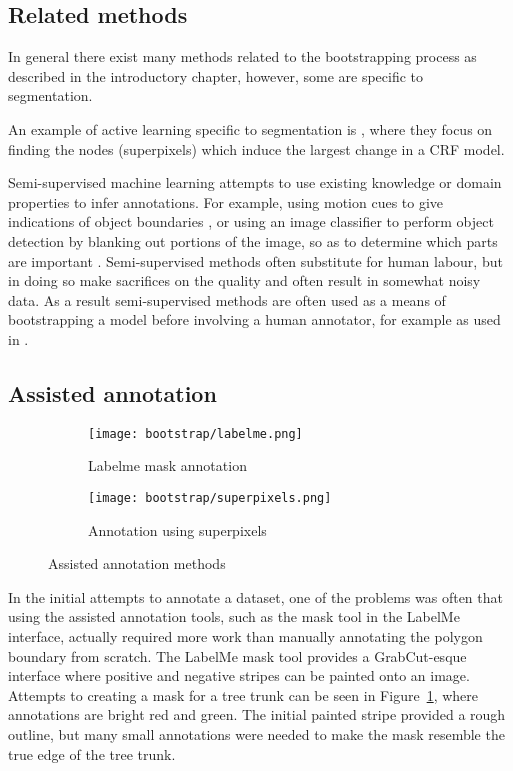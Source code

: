 \subsection{Related methods}


In general there exist many methods related to the bootstrapping process as described in the introductory chapter, however, some are specific to segmentation.  

An example of active learning specific to segmentation is \cite{Xu2017}, where they focus on finding the nodes (superpixels) which induce the largest change in a \gls{CRF} model.

Semi-supervised machine learning attempts to use existing knowledge or domain properties to infer annotations. For example, using motion cues to give indications of object boundaries \cite{Hong2017}, or using an image classifier to perform object detection by blanking out portions of the image, so as to determine which parts are important \cite{Bazzani2016}. Semi-supervised methods often substitute for human labour, but in doing so make sacrifices on the quality and often result in somewhat noisy data. As a result semi-supervised methods are often used as a means of bootstrapping a model before involving a human annotator, for example as used in \cite{Papadopoulos2016}.


\subsection {Assisted annotation}


\begin{figure}[ht]
\centering
\begin{subfigure}{.5\textwidth}
  \centering
  \texttt{[image: bootstrap/labelme.png]}
  \caption{Labelme mask annotation}  
  \label{fig:bootstrap_labelme}
\end{subfigure}%
\begin{subfigure}{.5\textwidth}
  \centering
  \texttt{[image: bootstrap/superpixels.png]}
  \caption{Annotation using superpixels}
  \label{fig:bootstrap_superpixels}
\end{subfigure}

\caption{Assisted annotation methods}
\label{fig:bootstrap_annot_method}
\end{figure}


In the initial attempts to annotate a dataset, one of the problems was often that using the assisted annotation tools, such as the mask tool in the LabelMe \cite{Russell2007} interface, actually required more work than manually annotating the polygon boundary from scratch. The LabelMe mask tool provides a GrabCut-esque interface where positive and negative stripes can be painted onto an image. Attempts to creating a mask for a tree trunk can be seen in Figure~\ref{fig:bootstrap_labelme}, where annotations are bright red and green. The initial painted stripe provided a rough outline, but many small annotations were needed to make the mask resemble the true edge of the tree trunk.

